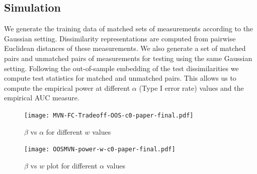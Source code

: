 \documentclass[12pt]{article} %
\begin{document}
\subsection{Simulation\label{subsec:sim}}

We generate the training data of matched sets of measurements according to  the Gaussian setting. Dissimilarity representations are computed from pairwise Euclidean distances of these measurements. We also generate a set of matched pairs and unmatched pairs of measurements for testing using the same Gaussian setting. Following the out-of-sample embedding of the test dissimilarities 
we compute test statistics  for matched and unmatched pairs. This allows us to compute the empirical power  at different $\alpha$ (Type I error rate) values and the empirical AUC measure.



\begin{figure}[tb]
     \centering
\texttt{[image: MVN-FC-Tradeoff-OOS-c0-paper-final.pdf]}
\caption{$\beta$ vs $\alpha$  for different $w$ values }
\label{fig:MVN-c0-power-alpha}
\end{figure}

\begin{figure}[tb]
      \centering
         \texttt{[image: OOSMVN-power-w-c0-paper-final.pdf]}
\caption{$\beta$ vs $w$ plot for different $\alpha$ values }
\label{fig:MVN-c0-power-w}
      

  \end{figure}
	
\end{document}
